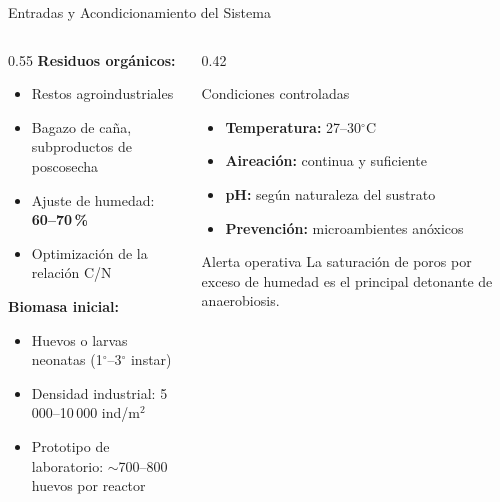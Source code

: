 \documentclass[aspectratio=169, 11pt]{beamer}
\begin{document}
\begin{frame}{Entradas y Acondicionamiento del Sistema}
\begin{columns}[T]
\begin{column}{0.55\textwidth}
\textbf{Residuos orgánicos:}
\begin{itemize}
    \item Restos agroindustriales
    \item Bagazo de caña, subproductos de poscosecha
    \item Ajuste de humedad: \textbf{60--70\,\%}
    \item Optimización de la relación C/N
\end{itemize}
\vspace{0.3cm}
\textbf{Biomasa inicial:}
\begin{itemize}
    \item Huevos o larvas neonatas (1$^\circ$--3$^\circ$ instar)
    \item Densidad industrial: 5\,000--10\,000 ind/m$^2$
    \item Prototipo de laboratorio: $\sim$700--800 huevos por reactor
\end{itemize}
\end{column}
\begin{column}{0.42\textwidth}
\begin{exampleblock}{Condiciones controladas}
\begin{itemize}
    \item \textbf{Temperatura:} 27--30$^\circ$C
    \item \textbf{Aireación:} continua y suficiente
    \item \textbf{pH:} según naturaleza del sustrato
    \item \textbf{Prevención:} microambientes anóxicos
\end{itemize}
\end{exampleblock}
\vspace{0.2cm}
\begin{alertblock}{Alerta operativa}
La saturación de poros por exceso de humedad es el principal detonante de anaerobiosis.
\end{alertblock}
\end{column}
\end{columns}
\end{frame}
\end{document}
